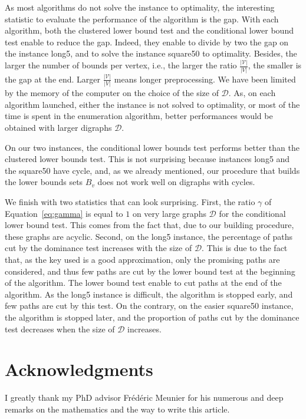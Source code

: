 \documentclass[11pt]{amsart}
\theoremstyle{plain}
\theoremstyle{remark}
\begin{document}
As most algorithms do not solve the instance to optimality, the interesting statistic to evaluate the performance of the algorithm is the gap. With each algorithm, both the clustered lower bound test and the conditional lower bound test enable to reduce the gap. Indeed, they enable to divide by two the gap on the instance long5, and to solve the instance square50 to optimality. Besides, the larger the number of bounds per vertex, i.e., the larger the ratio $\frac{|\mathcal{V}|}{|V|}$, the smaller is the gap at the end. Larger $\frac{|\mathcal{V}|}{|V|}$ means longer preprocessing. We have been limited by the memory of the computer on the choice of the size of $\mathcal{D}$. As, on each algorithm launched, either the instance is not solved to optimality, or most of the time is spent in the enumeration algorithm, better performances  would be obtained with larger digraphs $\mathcal{D}$.

On our two instances, the conditional lower bounds test performs better than the clustered lower bounds test. This is not surprising because instances long5 and the square50 have cycle, and, as we already mentioned, our procedure that builds the lower bounds sets $B_{v}$ does not work well on digraphs with cycles. 

We finish with two statistics that can look surprising. First, the ratio $\gamma$ of Equation~\eqref{eq:gamma} is equal to $1$ on very large graphs $\mathcal{D}$ for the conditional lower bound test. This comes from the fact that, due to our building procedure, these graphs are acyclic. Second, on the long5 instance, the percentage of paths cut by the dominance test increases with the size of $\mathcal{D}$. This is due to the fact that, as the key used is a good approximation, only the promising paths are considered, and thus few paths are cut by the lower bound test at the beginning of the algorithm. The lower bound test enable to cut paths at the end of the algorithm. As the long5 instance is difficult, the algorithm is stopped early, and few paths are cut by this test. On the contrary, on the easier square50 instance, the algorithm is stopped later, and the proportion of paths cut by the dominance test decreases when the size of $\mathcal{D}$ increases.
















\section*{Acknowledgments}
I greatly thank my PhD advisor Fr\'ed\'eric Meunier for his numerous and deep remarks on the mathematics and the way to write this article. 





\end{document}
